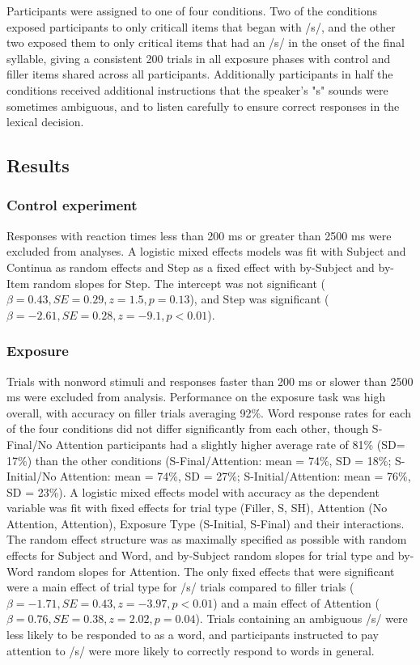 Participants were assigned to one of four conditions. 
Two of the conditions exposed participants to only criticall items that began with /s/, and the other two exposed them to only critical items that had an /s/ in the onset of the final syllable, giving a consistent 200 trials in all exposure phases with control and filler items shared across all participants. 
Additionally participants in half the conditions received additional instructions that the speaker's "s" sounds were sometimes ambiguous, and to listen carefully to ensure correct responses in the lexical decision.

\subsection{Results}

\subsubsection{Control experiment}

Responses with reaction times less than 200 ms or greater than 2500 ms were excluded from analyses. 
A logistic mixed effects models was fit with Subject and Continua as random effects and Step as a fixed effect with by-Subject and by-Item random slopes for Step. 
The intercept was not significant ($\beta = 0.43, SE = 0.29, z = 1.5, p = 0.13$), and Step was significant ($\beta = -2.61, SE = 0.28, z = -9.1, p < 0.01$).

\subsubsection{Exposure}

Trials with nonword stimuli and responses faster than 200 ms or slower than 2500 ms were excluded from analysis. 
Performance on the exposure task was high overall, with accuracy on filler trials averaging 92\%.  
Word response rates for each of the four conditions did not differ significantly from each other, though S-Final/No Attention participants had a slightly higher average rate of 81\% (SD= 17\%) than the other conditions (S-Final/Attention: mean = 74\%, SD = 18\%; S-Initial/No Attention: mean = 74\%, SD = 27\%; S-Initial/Attention: mean = 76\%, SD = 23\%). 
A logistic mixed effects model with accuracy as the dependent variable was fit with fixed effects for trial type (Filler, S, SH), Attention (No Attention, Attention), Exposure Type (S-Initial, S-Final) and their interactions. 
The random effect structure was as maximally specified as possible with random effects for Subject and Word, and by-Subject random slopes for trial type and by-Word random slopes for Attention. 
The only fixed effects that were significant were a main effect of trial type for /s/ trials compared to filler trials ($\beta = -1.71, SE = 0.43, z = -3.97, p < 0.01$) and a main effect of Attention ($\beta = 0.76, SE = 0.38, z = 2.02,   p = 0.04$).  
Trials containing an ambiguous /s/ were less likely to be responded to as a word, and participants instructed to pay attention to /s/ were more likely to correctly respond to words in general.

